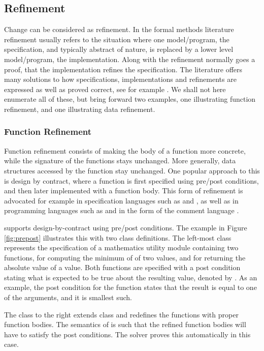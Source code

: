 \subsection{Refinement}

Change can be considered as refinement. In the formal methods literature
refinement usually refers to the situation where one model/program, the specification, and typically abstract of nature, is replaced by a lower 
level model/program, the implementation. Along with the refinement normally
goes a proof, that the implementation refines the specification.
The literature offers many solutions to how specifications, implementations and refinements are expressed as well as proved correct, see for example \cite{vdm,raise}. We shall not here enumerate all of these, but bring forward two examples, one illustrating function refinement, and one illustrating data refinement.

\subsubsection{Function Refinement}

Function refinement consists of making the body of a function more concrete,
while the signature of the functions stays unchanged. More generally, data 
structures accessed by the function stay unchanged. One popular approach to this
is design by contract, where a function is first specified using pre/post conditions, and then later implemented with a function body. This form of refinement is advocated for example in specification languages such as 
\vdm{} \cite{vdm} and \raiselang{} \cite{raise}, as well as in programming
languages such as \eiffel{} \cite{eiffel} and \java{} in the form of the \jml{}
comment language \cite{jml}. 

\Klang{} supports design-by-contract using pre/post conditions. The example in
Figure \ref{fig:prepost} illustrates this with two class definitions. The left-most
class  represents the specification of a mathematics utility module containing two functions,  for computing the minimum of of
two values, and  for returning the absolute value of a value. Both functions are specified with a post condition stating what is expected to be true
about the resulting value, denoted by . As an example, the post
condition for the  function states that the result is equal to one of
the arguments, and it is smallest such.

The class 
to the right extends class  and redefines the functions with
proper function bodies. The semantics of \Klang{} is such that the refined function bodies will have to satisfy the post conditions. The \Klang{} solver proves this
automatically in this case.

